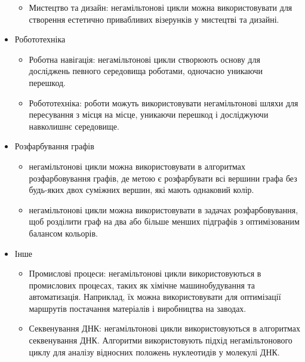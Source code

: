 \documentclass[14pt]{article}
\begin{document}
\begin{spacing}{1.175}
\begin{itemize}
\begin{itemize}
            \item Мистецтво та дизайн: негамільтонові цикли можна використовувати для створення естетично привабливих візерунків у мистецтві та дизайні.
        
        \end{itemize}
        
        \item Робототехніка
        
        \begin{itemize}
            \item Роботна навігація: негамільтонові цикли створюють основу для досліджень певного середовища роботами, одночасно уникаючи перешкод.

            \item Робототехніка: роботи можуть використовувати негамільтонові шляхи для пересування з місця на місце, уникаючи перешкод і досліджуючи навколишнє середовище.
        
        \end{itemize}


        \item Розфарбування графів
        \begin{itemize}
            
            \item негамільтонові цикли можна використовувати в алгоритмах розфарбовування графів, де метою є розфарбувати всі вершини графа без будь-яких двох суміжних вершин, які мають однаковий колір.

             \item негамільтонові цикли можна використовувати в задачах розфарбовування, щоб розділити граф на два або більше менших підграфів з оптимізованим балансом кольорів.
        
        \end{itemize}


        \item Інше
        \begin{itemize}
            
            \item Промислові процеси: негамільтонові цикли використовуються в промислових процесах, таких як хімічне машинобудування та автоматизація. Наприклад, їх можна використовувати для оптимізації маршрутів постачання матеріалів і виробництва на заводах.

            \item Секвенування ДНК: негамільтонові цикли використовуються в алгоритмах секвенування ДНК. Алгоритми використовують підхід негамільтонового циклу для аналізу відносних положень нуклеотидів у молекулі ДНК.


\end{itemize}
\end{itemize}
\end{spacing}
\end{document}
